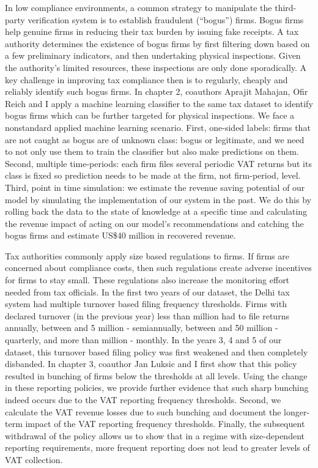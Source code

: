 {In low compliance environments, a common strategy to manipulate the third-party verification system is to establish fraudulent (``bogus'') firms. Bogus firms help genuine firms in reducing their tax burden by issuing fake receipts. A tax authority determines the existence of bogus firms by first filtering down based on a few preliminary indicators, and then undertaking  physical inspections. Given the authority’s limited resources, these inspections are only done sporadically. A key challenge in improving tax compliance then is to regularly, cheaply and reliably identify such bogus firms. In chapter 2, coauthors Aprajit Mahajan, Ofir Reich and I apply a machine learning classifier to the same tax dataset to identify bogus firms which can be further targeted for physical inspections. We face a nonstandard applied machine learning scenario. First, one-sided labels: firms that are not caught as bogus are of unknown class: bogus or legitimate, and we need to not only use them to train the classifier but also make predictions on them. Second, multiple time-periods: each firm files several periodic VAT returns but its class is fixed so prediction needs to be made at the firm, not firm-period, level. Third, point in time simulation: we estimate the revenue saving potential of our model by simulating the implementation of our system in the past. We do this by rolling back the data to the state of knowledge at a specific time and calculating the revenue impact of acting on our model’s recommendations and catching the bogus firms and estimate US\$40 million in recovered revenue.

Tax authorities commonly apply size based regulations to firms. If firms are concerned about compliance costs, then such regulations create adverse incentives for firms to stay small. These regulations also increase the monitoring effort needed from tax officials. In the first two years of our dataset, the Delhi tax system had multiple turnover based filing frequency thresholds. Firms with declared turnover (in the previous year) less than  million had to file returns annually, between  and 5 million - semiannually, between  and 50 million - quarterly, and more than  million - monthly. In the years 3, 4 and 5 of our dataset, this turnover based filing policy was first weakened and then completely disbanded. In chapter 3, coauthor Jan Luksic and I first show that this policy resulted in bunching of firms below the thresholds at all levels. Using the change in these reporting policies, we provide further evidence that such sharp bunching indeed occurs due to the VAT reporting frequency thresholds. Second, we calculate the VAT revenue losses due to such bunching and document the longer-term impact of the VAT reporting frequency thresholds. Finally, the subsequent withdrawal of the policy allows us to show that in a regime with size-dependent reporting requirements, more frequent reporting does not lead to greater levels of VAT collection.
}

